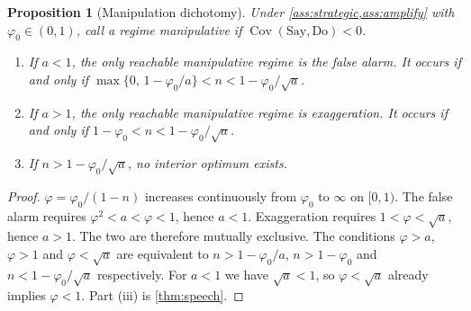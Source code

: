 \documentclass[11pt,a4paper]{article}
\theoremstyle{plain}
\newtheorem{proposition}[theorem]{Proposition}
\theoremstyle{definition}
\theoremstyle{remark}
\DeclareMathOperator{\Cov}{Cov}
\begin{document}
\begin{proposition}[Manipulation dichotomy]\label{prop:virality}
Under \cref{ass:strategic,ass:amplify} with $\varphi_0\in(0,1)$, call a regime \emph{manipulative} if $\Cov(\text{Say},\text{Do})<0$.
\begin{enumerate}[label=(\roman*)]
  \item If $a<1$, the only reachable manipulative regime is the false alarm. It occurs if and only if
  $\max\{0,\,1-\varphi_0/a\}<n<1-\varphi_0/\sqrt a$.
  \item If $a>1$, the only reachable manipulative regime is exaggeration. It occurs if and only if $1-\varphi_0<n<1-\varphi_0/\sqrt a$.
  \item If $n>1-\varphi_0/\sqrt a$, no interior optimum exists.
\end{enumerate}
\end{proposition}
\begin{proof}
$\varphi=\varphi_0/(1-n)$ increases continuously from $\varphi_0$ to $\infty$ on $[0,1)$. The false alarm requires $\varphi^2<a<\varphi<1$, hence $a<1$. Exaggeration requires $1<\varphi<\sqrt a$, hence $a>1$. The two are therefore mutually exclusive. The conditions $\varphi>a$, $\varphi>1$ and $\varphi<\sqrt a$ are equivalent to $n>1-\varphi_0/a$, $n>1-\varphi_0$ and $n<1-\varphi_0/\sqrt a$ respectively. For $a<1$ we have $\sqrt a<1$, so $\varphi<\sqrt a$ already implies $\varphi<1$. Part (iii) is \cref{thm:speech}.
\end{proof}
\end{document}
